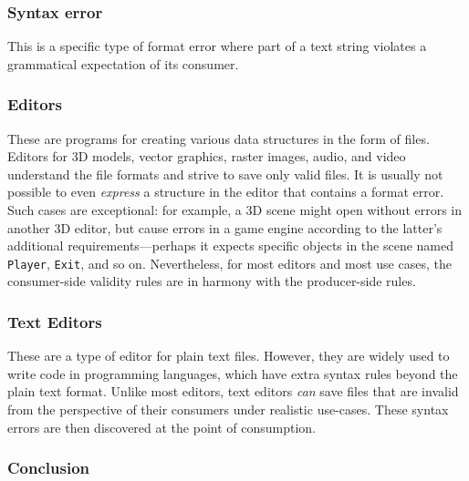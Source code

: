 \documentclass[ twoside,openright,titlepage,numbers=noenddot,headinclude,footinclude,cleardoublepage=empty,abstract=on,
                BCOR=5mm,paper=a4,fontsize=11pt
                ]{scrreprt}
\theoremstyle{definition}
\begin{document}
\hypertarget{syntax-error}{\subsubsection{Syntax error}\label{syntax-error}}

This is a specific type of format error where part of a text string
violates a grammatical expectation of its consumer.

\hypertarget{editors}{\subsubsection{Editors}\label{editors}}

These are programs for creating various data structures in the form of
files. Editors for 3D models, vector graphics, raster images, audio, and
video understand the file formats and strive to save only valid files.
It is usually not possible to even \emph{express} a structure in the
editor that contains a format error. Such cases are exceptional: for
example, a 3D scene might open without errors in another 3D editor, but
cause errors in a game engine according to the latter's additional
requirements---perhaps it expects specific objects in the scene named
\texttt{Player}, \texttt{Exit}, and so on. Nevertheless, for most
editors and most use cases, the consumer-side validity rules are in
harmony with the producer-side rules.

\hypertarget{text-editors}{\subsubsection{Text Editors}\label{text-editors}}

These are a type of editor for plain text files. However, they are
widely used to write code in programming languages, which have extra
syntax rules beyond the plain text format. Unlike most editors, text
editors \emph{can} save files that are invalid from the perspective of
their consumers under realistic use-cases. These syntax errors are then
discovered at the point of consumption.

\hypertarget{conclusion-2}{\subsubsection{Conclusion}\label{conclusion-2}}
\end{document}
